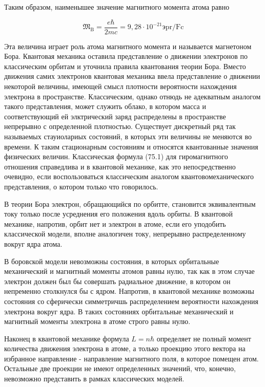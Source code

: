 \documentclass[12pt]{article}
\begin{document}
  Таким образом, наименышее значение магнитного момента атома равно

  $$
  \mathfrak{M}_{\mathrm{B}}=\frac{e \hbar}{2 m c}=9,28 \cdot 10^{-21} э \mathrm{pr} / \mathrm{Fc}
  $$

  Эта величина играет роль атома магнитного момента и называется магнетоном Бора.
  Квантовая механика оставила представление о движении электронов по классическим орбитам и уточнила правила квантования теории Бора. Вместо движения самих электронов квантовая механика ввела представление о движении некоторой величины, имеющей смысл плотности вероятности нахождения электрона в пространстве. Классическим, однако отнюдь не адекватным аналогом такого представления, может служить облако, в котором масса и соответствующий ей элктрический заряд распределены в пространстве непрерывно с определенной плотностью. Существует дискретный ряд так называемых стауиолариых состояний, в которых эти величины не меняются во времени. К таким стационарным состояниям и относятся квантованные значения физических величин. Классическая формула (75.1) для гиромагнитного отношения справедлива и в квантовой механике, как это непосредственно очевидно, если воспользоваться классическим аналогом квантовомеханического представления, о котором только что говорилось.

  В теории Бора электрон, обращающийся по орбитте, становится эквивалентным току только после усреднения его положения вдоль орбиты. В квантовой механике, напротив, орбит нет и электрон в атоме, если его уподобить классической модели, вполне аналогичен току, непрерывно распределенному вокруг ядра атома.

  В боровской модели невозможны состояния, в которых орбитальные механический и магнитный моменты атомов равны нулю, так как в этом случае электрон должен был бы совершать радиальное движение, в котором он непременно столкнулся бы с ядром. Напротив, в квантовой механике возможны состояния со сферически симметричшь распределением вероятности нахождения электрона вокруг ядра. В таких состояниях орбитальные механический и магнитный моменты электрона в атоме строго равны нулю.


  Наконец в квантовой механике формула $L=n \hbar$ определяет не полный момент количества движения электрона в атоме, а только проекцию этого вектора на избранное направление - направление магнитного поля, в которое помещен атом. Остальные две проекции не имеют определенных значений, что, конечно, невозможно представить в рамках классических моделей.
\end{document}
